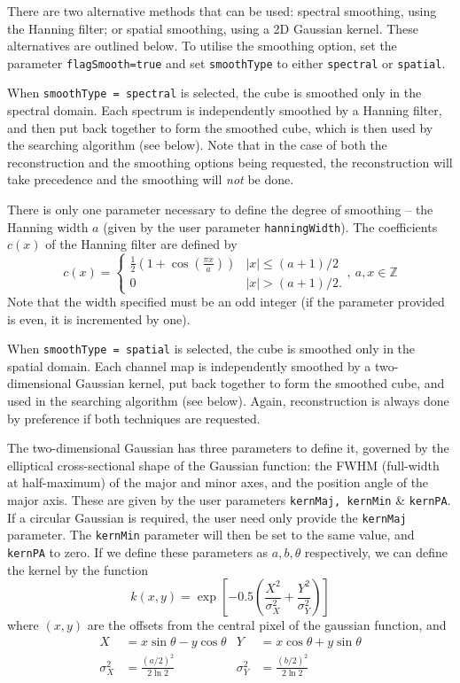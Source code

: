 There are two alternative methods that can be used: spectral
smoothing, using the Hanning filter; or spatial smoothing, using a 2D
Gaussian kernel. These alternatives are outlined below. To utilise the
smoothing option, set the parameter \texttt{flagSmooth=true} and set
\texttt{smoothType} to either \texttt{spectral} or \texttt{spatial}.


When \texttt{smoothType = spectral} is selected, the cube is smoothed
only in the spectral domain. Each spectrum is independently smoothed
by a Hanning filter, and then put back together to form the smoothed
cube, which is then used by the searching algorithm (see below). Note
that in the case of both the reconstruction and the smoothing options
being requested, the reconstruction will take precedence and the
smoothing will \emph{not} be done.

There is only one parameter necessary to define the degree of
smoothing -- the Hanning width $a$ (given by the user parameter
\texttt{hanningWidth}). The coefficients $c(x)$ of the Hanning filter
are defined by
\[
c(x) = 
  \begin{cases}
   \frac{1}{2}\left(1+\cos(\frac{\pi x}{a})\right) &|x| \leq (a+1)/2\\
   0                                               &|x| > (a+1)/2.
  \end{cases},\ a,x \in \mathbb{Z}
\]
Note that the width specified must be an
odd integer (if the parameter provided is even, it is incremented by
one).


When \texttt{smoothType = spatial} is selected, the cube is smoothed
only in the spatial domain. Each channel map is independently smoothed
by a two-dimensional Gaussian kernel, put back together to form the
smoothed cube, and used in the searching algorithm (see below). Again,
reconstruction is always done by preference if both techniques are
requested.

The two-dimensional Gaussian has three parameters to define it,
governed by the elliptical cross-sectional shape of the Gaussian
function: the FWHM (full-width at half-maximum) of the major and minor
axes, and the position angle of the major axis. These are given by the
user parameters \texttt{kernMaj, kernMin} \& \texttt{kernPA}. If a
circular Gaussian is required, the user need only provide the
\texttt{kernMaj} parameter. The \texttt{kernMin} parameter will then
be set to the same value, and \texttt{kernPA} to zero.  If we define
these parameters as $a,b,\theta$ respectively, we can define the
kernel by the function
\[ 
k(x,y) = \exp\left[-0.5 \left(\frac{X^2}{\sigma_X^2} + 
                              \frac{Y^2}{\sigma_Y^2}   \right) \right] 
\]
where $(x,y)$ are the offsets from the central pixel of the gaussian
function, and 
\begin{align*}
X& = x\sin\theta - y\cos\theta&
  Y&= x\cos\theta + y\sin\theta\\
\sigma_X^2& = \frac{(a/2)^2}{2\ln2}&
  \sigma_Y^2& = \frac{(b/2)^2}{2\ln2}\\
\end{align*}

